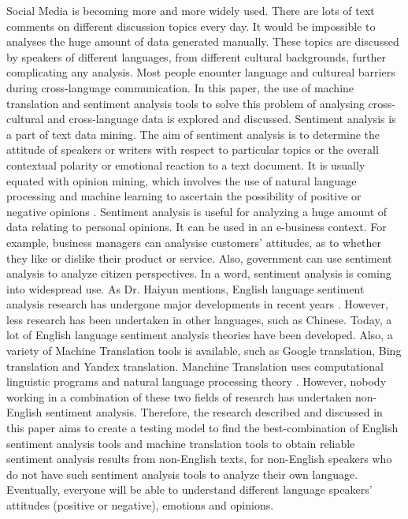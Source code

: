 \documentclass[conference]{IEEEtran}
\begin{document}
Social Media is becoming more and more widely used. There are lots of text comments
on different discussion topics every day.
It would be impossible to analyses the huge amount of data generated manually.
These topics are discussed by speakers of different languages, from different
cultural backgrounds, further complicating any analysis.
Most people enounter language and cultureal barriers during cross-language
communication.
In this paper, the use of machine translation and sentiment analysis tools to
solve this problem of analysing cross-cultural and cross-language data is
explored and discussed.
Sentiment analysis is a part of text data mining. The aim of sentiment analysis
is to determine the attitude of speakers or writers with respect to particular topics
or the overall contextual polarity or emotional reaction to a text document. It is usually equated with
opinion mining, which involves the use of natural language processing and
machine learning to ascertain the possibility of positive or negative opinions \cite{sentimentAnalysis}.
Sentiment analysis is useful for analyzing a huge amount of data relating to personal
opinions. It can be used in an e-business context. For example, business managers can analysise
customers' attitudes, as to whether they like or dislike their product or service.
Also, government can use sentiment analysis to analyze citizen perspectives.
In a word, sentiment analysis is coming into widespread use.
As Dr. Haiyun mentions, English language sentiment analysis research has
undergone major developments in recent years \cite{ChineseSentimentAnalysis}.
However, less research has been undertaken in other languages, such as Chinese.
Today, a lot of English language sentiment analysis theories have been
developed. Also, a variety of Machine Translation tools is available, such as Google
translation, Bing translation and Yandex translation.
Manchine Translation uses computational linguistic programs and natural language
processing theory \cite{machineTranslation}.
However, nobody working in a combination of these two fields of research has undertaken non-English
sentiment analysis. Therefore, the research described and discussed in this paper aims to create a testing model to find the best-combination of English
sentiment analysis tools and machine translation tools to obtain reliable
sentiment analysis results from non-English texts, for non-English speakers who
do not have such sentiment analysis tools to analyze their own language.
Eventually, everyone will be able to understand different language speakers' attitudes (positive or negative), emotions and opinions.\\
\end{document}
